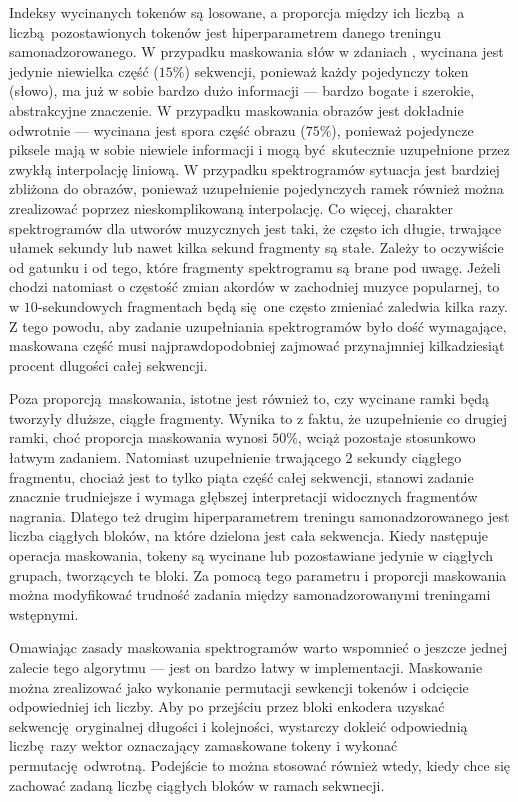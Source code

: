 Indeksy wycinanych tokenów są losowane, a proporcja między ich liczbą a liczbą pozostawionych
tokenów jest hiperparametrem danego treningu samonadzorowanego. W przypadku maskowania słów w
zdaniach \cite{devlin_bert_2019}, wycinana jest jedynie niewielka część ($15\%$) sekwencji, ponieważ
każdy pojedynczy token (słowo), ma już w sobie bardzo dużo informacji --- bardzo bogate i szerokie,
abstrakcyjne znaczenie. W przypadku maskowania obrazów \cite{he_masked_2021} jest dokładnie
odwrotnie --- wycinana jest spora część obrazu ($75\%$), ponieważ pojedyncze piksele mają w sobie
niewiele informacji i mogą być skutecznie uzupełnione przez zwykłą interpolację liniową. W przypadku
spektrogramów sytuacja jest bardziej zbliżona do obrazów, ponieważ uzupełnienie pojedynczych ramek
również można zrealizować poprzez nieskomplikowaną interpolację. Co więcej, charakter spektrogramów
dla utworów muzycznych jest taki, że często ich długie, trwające ułamek sekundy lub nawet kilka
sekund fragmenty są stałe. Zależy to oczywiście od gatunku i od tego, które fragmenty spektrogramu
są brane pod uwagę. Jeżeli chodzi natomiast o częstość zmian akordów w zachodniej muzyce popularnej,
to w $10$-sekundowych fragmentach będą się one często zmieniać zaledwia kilka razy. Z tego powodu,
aby zadanie uzupełniania spektrogramów było dość wymagające, maskowana część musi najprawdopodobniej
zajmować przynajmniej kilkadziesiąt procent dlugości całej sekwencji.

Poza proporcją maskowania, istotne jest również to, czy wycinane ramki będą tworzyły dłuższe, ciągłe
fragmenty. Wynika to z faktu, że uzupełnienie co drugiej ramki, choć proporcja maskowania wynosi
$50\%$, wciąż pozostaje stosunkowo łatwym zadaniem. Natomiast uzupełnienie trwającego $2$ sekundy
ciągłego fragmentu, chociaż jest to tylko piąta część całej sekwencji, stanowi zadanie znacznie
trudniejsze i wymaga głębszej interpretacji widocznych fragmentów nagrania. Dlatego też drugim
hiperparametrem treningu samonadzorowanego jest liczba ciągłych bloków, na które dzielona jest cała
sekwencja. Kiedy następuje operacja maskowania, tokeny są wycinane lub pozostawiane jedynie w
ciągłych grupach, tworzących te bloki. Za pomocą tego parametru i proporcji maskowania można
modyfikować trudność zadania między samonadzorowanymi treningami wstępnymi.

Omawiając zasady maskowania spektrogramów warto wspomnieć o jeszcze jednej zalecie tego algorytmu
--- jest on bardzo łatwy w implementacji. Maskowanie można zrealizować jako wykonanie permutacji
sewkencji tokenów i odcięcie odpowiedniej ich liczby. Aby po przejściu przez bloki enkodera uzyskać
sekwencję oryginalnej długości i kolejności, wystarczy dokleić odpowiednią liczbę razy wektor
oznaczający zamaskowane tokeny i wykonać permutację odwrotną. Podejście to można stosować również
wtedy, kiedy chce się zachować zadaną liczbę ciągłych bloków w ramach sekwnecji.

